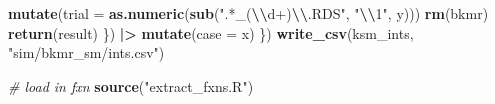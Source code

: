 \documentclass[12pt, twoside]{amherstthesis}
\newenvironment{Shaded}{\begin{snugshade}}{\end{snugshade}}
\newcommand{\AttributeTok}[1]{\textcolor[rgb]{0.13,0.29,0.53}{#1}}
\newcommand{\CommentTok}[1]{\textcolor[rgb]{0.56,0.35,0.01}{\textit{#1}}}
\newcommand{\FunctionTok}[1]{\textcolor[rgb]{0.13,0.29,0.53}{\textbf{#1}}}
\newcommand{\NormalTok}[1]{#1}
\newcommand{\SpecialCharTok}[1]{\textcolor[rgb]{0.81,0.36,0.00}{\textbf{#1}}}
\newcommand{\StringTok}[1]{\textcolor[rgb]{0.31,0.60,0.02}{#1}}
\begin{document}
\begin{Shaded}
\begin{Highlighting}[]
          \FunctionTok{mutate}\NormalTok{(}\AttributeTok{trial =} \FunctionTok{as.numeric}\NormalTok{(}\FunctionTok{sub}\NormalTok{(}\StringTok{".*\_(}\SpecialCharTok{\textbackslash{}\textbackslash{}}\StringTok{d+)}\SpecialCharTok{\textbackslash{}\textbackslash{}}\StringTok{.RDS"}\NormalTok{, }\StringTok{"}\SpecialCharTok{\textbackslash{}\textbackslash{}}\StringTok{1"}\NormalTok{, y)))}
        \FunctionTok{rm}\NormalTok{(bkmr)}
        \FunctionTok{return}\NormalTok{(result)}
\NormalTok{      \}) }\SpecialCharTok{|\textgreater{}} 
      \FunctionTok{mutate}\NormalTok{(}\AttributeTok{case =}\NormalTok{ x)}
\NormalTok{  \})}
\FunctionTok{write\_csv}\NormalTok{(ksm\_ints, }\StringTok{"sim/bkmr\_sm/ints.csv"}\NormalTok{)}

\CommentTok{\# load in fxn}
\FunctionTok{source}\NormalTok{(}\StringTok{"extract\_fxns.R"}\NormalTok{)}


\end{Highlighting}
\end{Shaded}
\end{document}
